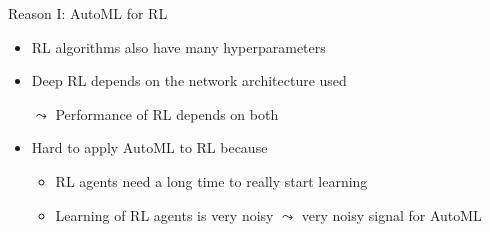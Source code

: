 \documentclass[aspectratio=169]{../latex_main/tntbeamer}  %
\begin{document}
\begin{frame}[c]{Reason I: AutoML for RL}
	
	\begin{itemize}
		\item RL algorithms also have many hyperparameters 
		\item Deep RL depends on the network architecture used 
		\item[$\leadsto$] Performance of RL depends on both\newline {} 
		\pause
		\bigskip
		\item Hard to apply AutoML to RL because
		\begin{itemize}
			\item RL agents need a long time to really start learning 
			\item Learning of RL agents is very noisy $\leadsto$ very noisy signal for AutoML
		\end{itemize}
	\end{itemize}
	
\end{frame}
\end{document}
